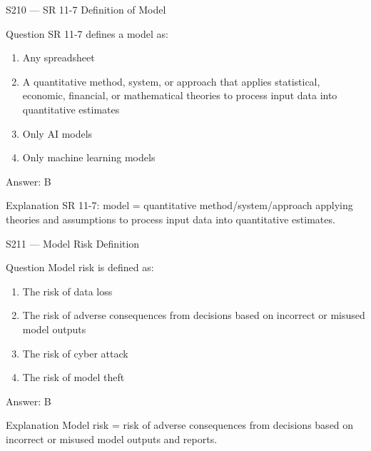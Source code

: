\documentclass[aspectratio=169,8pt]{beamer}
\begin{document}
\begin{frame}{S210 --- SR 11-7 Definition of Model}
	\begin{block}{Question}
		SR 11-7 defines a model as:
		\begin{enumerate}
			\item Any spreadsheet
			\item A quantitative method, system, or approach that applies statistical, economic, financial, or mathematical theories to process input data into quantitative estimates
			\item Only AI models
			\item Only machine learning models
		\end{enumerate}
	\end{block}
	\begin{exampleblock}{Answer: B}\end{exampleblock}
	\begin{block}{Explanation}
		SR 11-7: model = quantitative method/system/approach applying theories and assumptions to process input data into quantitative estimates.
	\end{block}
\end{frame}

\begin{frame}{S211 --- Model Risk Definition}
	\begin{block}{Question}
		Model risk is defined as:
		\begin{enumerate}
			\item The risk of data loss
			\item The risk of adverse consequences from decisions based on incorrect or misused model outputs
			\item The risk of cyber attack
			\item The risk of model theft
		\end{enumerate}
	\end{block}
	\begin{exampleblock}{Answer: B}\end{exampleblock}
	\begin{block}{Explanation}
		Model risk = risk of adverse consequences from decisions based on incorrect or misused model outputs and reports.
	\end{block}
\end{frame}
\end{document}
